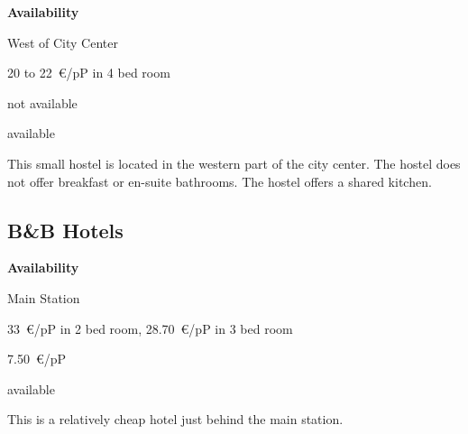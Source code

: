 \begin{labeling}{\bf Availability}
  \item[\bf Location] West of City Center
  \item[\bf Price] \num{20} to \SI{22}{\euro/{pP}} in 4 bed room
  \item[\bf Breakfast] not available
  \item[\bf Availability] available
\end{labeling}

This small hostel is located in the western part of the city center. The hostel
does not offer breakfast or en-suite bathrooms. The hostel offers a shared
kitchen.

\subsection{B\&B Hotels}

\begin{labeling}{\bf Availability}
  \item[\bf Location] Main Station
  \item[\bf Price] \SI{33}{\euro/{pP}} in 2 bed room, \SI{28.70}{\euro/{pP}} in 3 bed room
  \item[\bf Breakfast] \SI{7,50}{\euro/{pP}}
  \item[\bf Availability] available
\end{labeling}

This is a relatively cheap hotel just behind the main station.


\newpage
